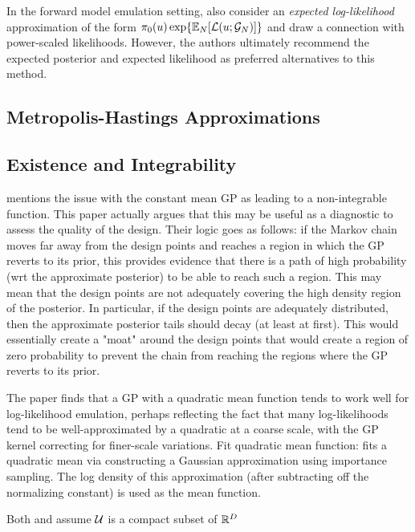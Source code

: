 \documentclass[12pt]{article}
\begin{document}
In the forward model emulation setting, \citet{BurknerSurrogate} also consider an \textit{expected log-likelihood}
approximation of the form $\priorDens(\Par) \Exp{\E_{\Ndesign}[\llik(\Par; \fwdEm[\Ndesign])]}$ and draw 
a connection with power-scaled likelihoods. However, the authors ultimately recommend the expected 
posterior and expected likelihood as preferred alternatives to this method.

\subsection{Metropolis-Hastings Approximations} \label{sec:MH-approx}

\subsection{Existence and Integrability} \label{sec:existence}
\citet{emPostDens} mentions the issue with the constant mean GP as leading to a non-integrable 
function. This paper actually argues that this may be useful as a diagnostic to assess the quality 
of the design. Their logic goes as follows: if the Markov chain moves far away from the design 
points and reaches a region in which the GP reverts to its prior, this provides evidence that 
there is a path of high probability (wrt the approximate posterior) to be able to reach such a region.
This may mean that the design points are not adequately covering the high density region of the
posterior. In particular, if the design points are adequately distributed, then the approximate posterior 
tails should decay (at least at first). This would essentially create a "moat" around the design points
that would create a region of zero probability to prevent the chain from reaching the regions 
where the GP reverts to its prior.

The paper \cite{VehtariParallelGP} finds that a GP with a quadratic mean function tends to 
work well for log-likelihood emulation, perhaps reflecting the fact that many log-likelihoods tend to be well-approximated by 
a quadratic at a coarse scale, with the GP kernel correcting for finer-scale variations. 
Fit quadratic mean function: \citet{emPostDens}
\citet{emPostDens} fits a quadratic mean via constructing a Gaussian approximation using importance sampling.
The log density of this approximation (after subtracting off the normalizing constant) is used as the 
mean function.

Both \cite{VehtariParallelGP} and \cite{StuartTeck1} assume $\parSpace$ is a compact subset of $\R^{\dimPar}$
\end{document}
